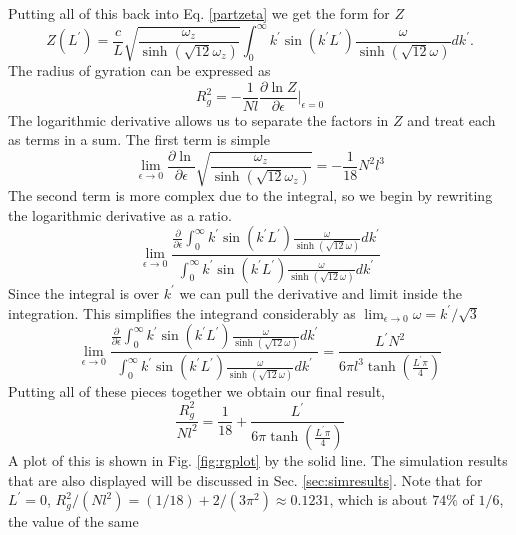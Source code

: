 \documentclass[pre,showpacs]{revtex4}
\begin{document}
Putting all of this back into Eq. \ref{partzeta} we get the form for $Z$
\begin{equation}
Z(L^\prime) = \frac{c}{L} \sqrt{\frac{\omega_z}{\sinh{(\sqrt{12}\omega_z)}}} \int_0^\infty k^\prime \sin(k^\prime L^\prime) \frac{\omega}{\sinh(\sqrt{12}\omega)} dk^\prime .
\end{equation}
The radius of gyration can be expressed as
\begin{equation}
R_g^2 = -\frac{1}{Nl}\frac{\partial \ln Z}{\partial \epsilon}\vert_{\epsilon=0}
\end{equation}
The logarithmic derivative allows us to separate the factors in $Z$ and treat each as terms in a sum.
The first term is simple
\begin{equation}
\lim_{\epsilon\to0}\frac{\partial \ln}{\partial \epsilon}\sqrt{\frac{\omega_z}{\sinh{(\sqrt{12}\omega_z)}}} = -\frac{1}{18}N^2l^3
\end{equation}
The second term is more complex due to the integral, so we begin by rewriting the logarithmic derivative as a ratio.
\begin{equation}
\lim_{\epsilon\to0} \frac{\frac{\partial}{\partial \epsilon}\int_0^\infty k^\prime \sin(k^\prime L^\prime) \frac{\omega}{\sinh(\sqrt{12}\omega)} dk^\prime}{\int_0^\infty k^\prime \sin(k^\prime L^\prime) \frac{\omega}{\sinh(\sqrt{12}\omega)} dk^\prime}
\end{equation}
Since the integral is over $k^\prime$ we can pull the derivative and limit inside the integration. This simplifies the integrand considerably as $\lim_{\epsilon\to0} \omega = k^\prime/\sqrt{3}$
\begin{equation}
\lim_{\epsilon\to0} \frac{\frac{\partial}{\partial \epsilon}\int_0^\infty k^\prime \sin(k^\prime L^\prime) \frac{\omega}{\sinh(\sqrt{12}\omega)} dk^\prime}{\int_0^\infty k^\prime \sin(k^\prime L^\prime) \frac{\omega}{\sinh(\sqrt{12}\omega)} dk^\prime}  = \frac{L^\prime N^2}{6\pi l^3\tanh(\frac{L^\prime \pi}{4}) }
\end{equation}
Putting all of these pieces together we obtain our final result,
\begin{equation}
\label{eq:finalresult}
\frac{R_g^2}{Nl^2} = \frac{1}{18} + \frac{L^\prime}{6\pi\tanh(\frac{L^\prime\pi}{4})}
\end{equation}
A plot of this is shown in Fig. \ref{fig:rgplot} by the solid line. The simulation results that are also displayed will be discussed in Sec. \ref{sec:simresults}.
Note that for $L^\prime = 0$, $R_g^2/(N l^2) = (1/18) + 2/(3 \pi^2) \approx 0.1231$, which is about $74\%$ of $1/6$, the value of the same
\end{document}
